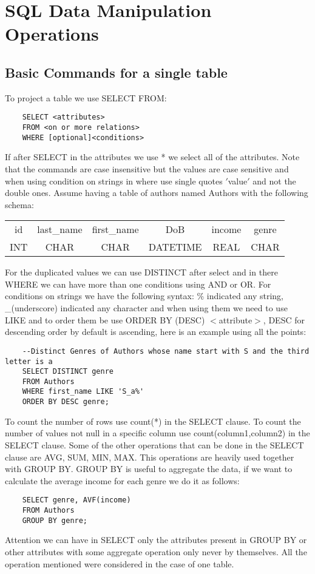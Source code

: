 \documentclass[a4page, 11pt]{article}
\begin{document}
\section{SQL Data Manipulation Operations}

\subsection{Basic Commands for a single table}
To project a table we use SELECT FROM:

\begin{lstlisting}
	SELECT <attributes>
	FROM <on or more relations>
	WHERE [optional]<conditions>
\end{lstlisting}

If after SELECT in the attributes we use * we select all of the attributes. Note that the commands are case insensitive but the values are case sensitive and when using condition on strings in where use single quotes $'$value$'$ and not the double ones.\newline
Assume having a table of authors named Authors with the following schema:
\begin{table}[h]
	\centering
	\begin{tabular}{c c c c c c}
		id & last\_name & first\_name & DoB & income & genre\\
		INT & CHAR & CHAR & DATETIME & REAL & CHAR\\
	\end{tabular}
\end{table}


For the duplicated values we can use DISTINCT after select and in there WHERE we can have more than one conditions using AND or OR.\newline
For conditions on strings we have the following syntax: \% indicated any string, \_(underscore) indicated any character and when using them we need to use LIKE and to order them be use ORDER BY (DESC) $<$attribute$>$, DESC for descending order by default is ascending, here is an example using all the points:
\pagebreak
\begin{lstlisting}
	--Distinct Genres of Authors whose name start with S and the third letter is a
	SELECT DISTINCT genre
	FROM Authors
	WHERE first_name LIKE 'S_a%'
	ORDER BY DESC genre;
\end{lstlisting}

To count the number of rows use count(*) in the SELECT clause. To count the number of values not null in a specific column use count(column1,column2) in the SELECT clause. Some of the other operations that can be done in the SELECT clause are AVG, SUM, MIN, MAX.\newline
This operations are heavily used together with GROUP BY. GROUP BY  is useful to aggregate the data, if we want to calculate the average income for each genre we do it as follows:
\begin{lstlisting}
	SELECT genre, AVF(income)
	FROM Authors
	GROUP BY genre;
\end{lstlisting}
Attention we can have in SELECT only the attributes present in GROUP BY or other attributes with some aggregate operation only never by themselves. All the operation mentioned were considered in the case of one table.
\end{document}
